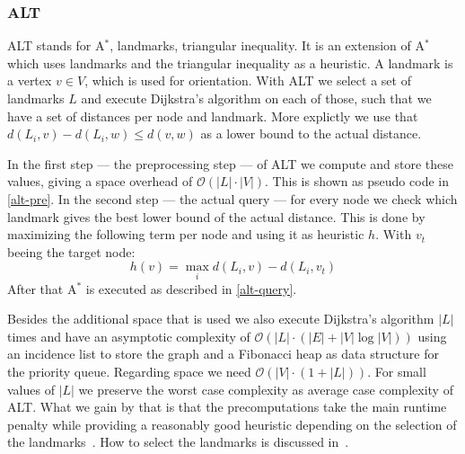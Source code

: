         \subsubsection*{ALT}
            ALT stands for A$^*$, landmarks, triangular inequality. 
            It is an extension of A$^*$ which uses landmarks and the triangular inequality as a heuristic. 
            A landmark is a vertex $v \in V$, which is used for orientation. 
            With ALT we select a set of landmarks $L$ and execute Dijkstra's algorithm on each of those, such that we have a set of distances per node and landmark.
            More explictly we use that $d(L_i, v) - d(L_i, w) \leq d(v,w)$ as a lower bound to the actual distance.
            
            In the first step --- the preprocessing step --- of ALT we compute and store these values, giving a space overhead of $\mathcal{O}(|L| \cdot |V|)$. 
            This is shown as pseudo code in \ref{alt-pre}.
            In the second step --- the actual query --- for every node we check which landmark gives the best lower bound of the actual distance.
            This is done by maximizing the following term per node and using it as heuristic $h$.
            With $v_t$ beeing the target node: 
            \[ h(v) = \max_i d(L_i, v) - d(L_i, v_t) \]
            After that A$^*$ is executed as described in \ref{alt-query}.
            
            Besides the additional space that is used we also execute Dijkstra's algorithm $|L|$ times and have an asymptotic complexity of $\mathcal{O}(|L| \cdot (|E| + |V| \log |V|))$ using an incidence list to store the graph and a Fibonacci heap as data structure for the priority queue. 
            Regarding space we need $\mathcal{O}(|V| \cdot (1 + |L|))$. 
            For small values of $|L|$ we preserve the worst case complexity as average case complexity of ALT.
            What we gain by that is that the precomputations take the main runtime penalty while providing a reasonably good heuristic depending on the selection of the landmarks~\autocite{goldberg2005computing}. 
            How to select the landmarks is discussed in~\autocite{Goldberg2005ComputingPS}.
            
